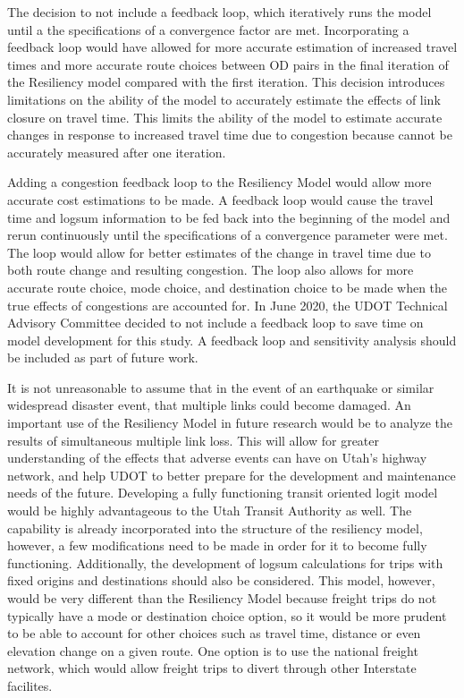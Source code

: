 The decision to not include a feedback loop, which iteratively runs the model
until a the specifications of a convergence factor are met. Incorporating a
feedback loop would have allowed for more accurate estimation of increased
travel times and more accurate route choices between OD pairs in the final
iteration of the Resiliency model compared with the first iteration.
This decision introduces limitations on the
ability of the model to accurately estimate the effects of link closure on
travel time. This limits the ability of the model to estimate accurate changes in
response to increased travel time due to congestion because cannot be
accurately measured after one iteration.

Adding a congestion feedback loop to the Resiliency Model would allow more
accurate cost estimations to be made. A feedback loop would cause the
travel time and logsum information to be fed back into the beginning of the
model and rerun continuously until the specifications of a convergence
parameter were met. The loop would allow for better estimates of the change
in travel time due to both route change and resulting congestion. The loop
also allows for more accurate route choice, mode choice, and destination
choice to be made when the true effects of congestions are accounted for.
In June 2020, the UDOT Technical Advisory Committee decided to not include a
feedback loop to save time
on model development for this study. A feedback loop and sensitivity analysis
should be included as part of future work.

It is not unreasonable to assume that in the event of an earthquake or
similar widespread disaster event, that multiple links could become
damaged. An important use of the Resiliency Model in future research would be
to analyze the results of simultaneous multiple link
loss. This will allow for
greater understanding of the effects that adverse events can have on Utah’s
highway network, and help UDOT to better prepare for the development and
maintenance needs of the future. Developing a fully functioning transit oriented logit model
would be highly advantageous to the Utah Transit Authority as well. The capability
is already incorporated into the structure of the resiliency model, however, a few modifications
need to be made in order for it to become fully functioning.
Additionally, the development of logsum calculations for trips with fixed
origins and destinations should also be considered. This model, however,
would be very different than the Resiliency Model because freight trips
do not typically have a mode or destination choice option, so it would be
more prudent to be able to account for other choices such as travel time,
distance or even elevation change on a given route. One option is to use the national
freight network, which would allow freight trips to divert through other Interstate
facilites.



